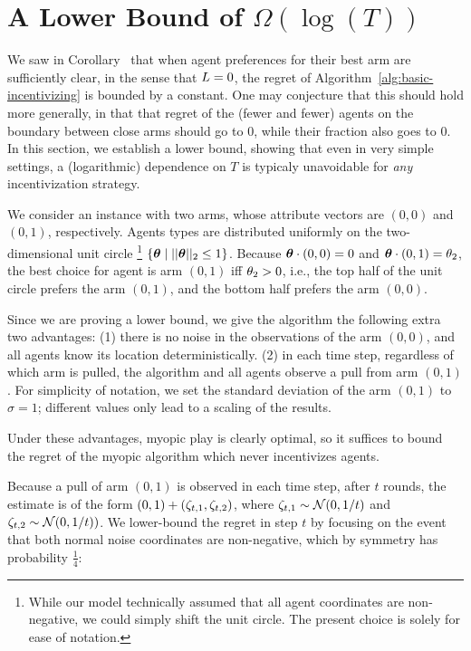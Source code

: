 \newcommand{\dd}{\mathrm{d}}
\newcommand{\quarter}{\ensuremath{\frac{1}{4}}\xspace}

\section{A Lower Bound of $\Omega(\log(T))$} \label{sec:lb}

We saw in Corollary~ that
when agent preferences for their best arm are sufficiently clear,
in the sense that $L = 0$, the regret of
Algorithm~\ref{alg:basic-incentivizing} is bounded by a constant.
One may conjecture that this should hold more generally,
in that that regret of the (fewer and fewer) agents on the boundary
between close arms should go to 0, while their fraction also goes to 0.
In this section, we establish a lower bound,
showing that even in very simple settings, a (logarithmic) dependence
on $T$ is typicaly unavoidable for \emph{any} incentivization strategy.

We consider an instance with two arms,
whose attribute vectors are $(0,0)$ and $(0,1)$, respectively.
Agents types are distributed uniformly on the two-dimensional unit circle%
\footnote{While our model technically assumed that all agent coordinates are
non-negative, we could simply shift the unit circle.
The present choice is solely for ease of notation.}  
$\{ \bm{\theta} \mid || \bm{\theta} ||_2 \leq 1 \}$.
Because $\bm{\theta} \cdot (0,0) = 0$ and $\bm{\theta} \cdot (0,1) = \theta_{2}$,
the best choice for agent \AgV is arm $(0,1)$ iff $\theta_{2} > 0$,
i.e., the top half of the unit circle prefers the arm $(0,1)$,
and the bottom half prefers the arm $(0,0)$.

Since we are proving a lower bound, we give the algorithm the
following extra two advantages:
(1) there is no noise in the observations of the arm $(0,0)$,
and all agents know its location deterministically.
(2) in each time step, regardless of which arm is pulled, the algorithm
and all agents observe a pull from arm $(0,1)$.
For simplicity of notation, we set the standard deviation of the arm
$(0,1)$ to $\sigma = 1$; different values only lead to a scaling of
the results.

Under these advantages, myopic play is clearly optimal, so it suffices
to bound the regret of the myopic algorithm which never incentivizes
agents. 

Because a pull of arm $(0,1)$ is observed in each time step,
after $t$ rounds, the estimate  is of the form
$(0,1) + (\Noise[t]{1}, \Noise[t]{2})$,
where $\Noise[t]{1} \sim \Normal{0}{1/t}$
and $\Noise[t]{2} \sim \Normal{0}{1/t})$.
We lower-bound the regret in step $t$ by focusing on the event that
both normal noise coordinates are non-negative,
which by symmetry has probability \quarter:

